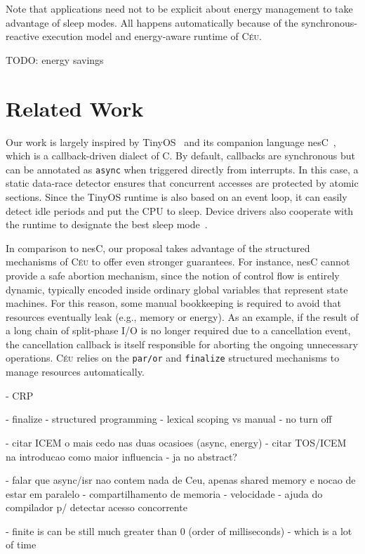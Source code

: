 \documentclass[sigplan,10pt,review,anonymous]{acmart}\settopmatter{printfolios=true,printccs=false,printacmref=false}
\newcommand{\CEU}{\textsc{C\'{e}u}\xspace}
\newcommand{\code}[1] {{\small{\texttt{#1}}}}
\begin{document}
Note that applications need not to be explicit about energy management to take
advantage of sleep modes.
All happens automatically because of the synchronous-reactive execution model
and energy-aware runtime of \CEU.

TODO: energy savings

\section{Related Work}

Our work is largely inspired by TinyOS~\cite{wsn.tos} and its companion
language nesC~\cite{wsn.nesc}, which is a callback-driven dialect of C.
%
By default, callbacks are synchronous but can be annotated as \code{async} when
triggered directly from interrupts.
In this case, a static data-race detector ensures that concurrent accesses are
protected by atomic sections.
%
Since the TinyOS runtime is also based on an event loop, it can easily detect
idle periods and put the CPU to sleep.
Device drivers also cooperate with the runtime to designate the best sleep
mode~\cite{wsn.icem}.

In comparison to nesC, our proposal takes advantage of the structured
mechanisms of \CEU to offer even stronger guarantees.
%
For instance, nesC cannot provide a safe abortion mechanism, since the notion
of control flow is entirely dynamic, typically encoded inside ordinary global
variables that represent state machines.
%
For this reason, some manual bookkeeping is required to avoid that resources
eventually leak (e.g., memory or energy).
As an example, if the result of a long chain of split-phase I/O is no longer
required due to a cancellation event, the cancellation callback is itself
responsible for aborting the ongoing unnecessary operations.
%
\CEU relies on the \code{par/or} and \code{finalize} structured mechanisms to
manage resources automatically.

- CRP

- finalize
- structured programming
    - lexical scoping vs manual
    - no turn off

- citar ICEM o mais cedo nas duas ocasioes (async, energy)
- citar TOS/ICEM na introducao como maior influencia
    - ja no abstract?

- falar que async/isr nao contem nada de Ceu, apenas shared memory e nocao de estar em paralelo
    - compartilhamento de memoria
        - velocidade
    - ajuda do compilador p/ detectar acesso concorrente

- finite is can be still much greater than 0 (order of milliseconds)
    - which is a lot of time
\end{document}
